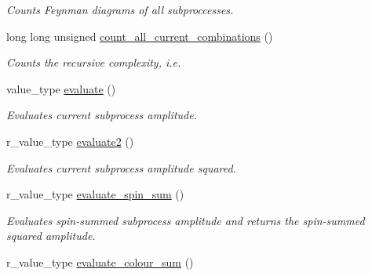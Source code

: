 \begin{DoxyCompactItemize}
\begin{DoxyCompactList}\small\item\em Counts Feynman diagrams of all subproccesses. \end{DoxyCompactList}\item 
long long unsigned \hyperlink{a00065_a92160db9f0d2e80d79f6927668224480}{count\+\_\+all\+\_\+current\+\_\+combinations} ()
\begin{DoxyCompactList}\small\item\em Counts the recursive complexity, i.\+e. \end{DoxyCompactList}\item 
\hypertarget{a00065_ae19da65c82df03b814f5ccabc994639b}{}value\+\_\+type \hyperlink{a00065_ae19da65c82df03b814f5ccabc994639b}{evaluate} ()\label{a00065_ae19da65c82df03b814f5ccabc994639b}

\begin{DoxyCompactList}\small\item\em Evaluates current subprocess amplitude. \end{DoxyCompactList}\item 
\hypertarget{a00065_a7147b8a2a31ea51584956656c8fba463}{}r\+\_\+value\+\_\+type \hyperlink{a00065_a7147b8a2a31ea51584956656c8fba463}{evaluate2} ()\label{a00065_a7147b8a2a31ea51584956656c8fba463}

\begin{DoxyCompactList}\small\item\em Evaluates current subprocess amplitude squared. \end{DoxyCompactList}\item 
\hypertarget{a00065_acbd9deb20158ae0e76b30a166063d576}{}r\+\_\+value\+\_\+type \hyperlink{a00065_acbd9deb20158ae0e76b30a166063d576}{evaluate\+\_\+spin\+\_\+sum} ()\label{a00065_acbd9deb20158ae0e76b30a166063d576}

\begin{DoxyCompactList}\small\item\em Evaluates spin-\/summed subprocess amplitude and returns the spin-\/summed squared amplitude. \end{DoxyCompactList}\item 
\hypertarget{a00065_aec23cda7c4ef2db43d987f2f2bb38c78}{}r\+\_\+value\+\_\+type \hyperlink{a00065_aec23cda7c4ef2db43d987f2f2bb38c78}{evaluate\+\_\+colour\+\_\+sum} ()\label{a00065_aec23cda7c4ef2db43d987f2f2bb38c78}


\end{DoxyCompactItemize}
